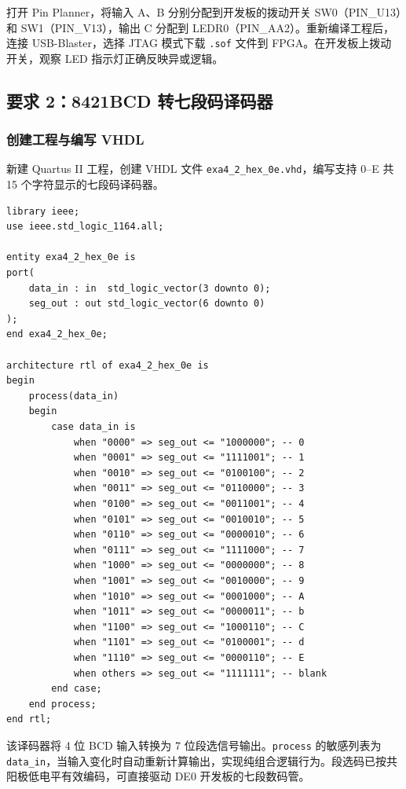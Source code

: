 \documentclass[12pt]{ctexart}
\begin{document}
打开 Pin Planner，将输入 A、B 分别分配到开发板的拨动开关 SW0（PIN\_U13）和 SW1（PIN\_V13），输出 C 分配到 LEDR0（PIN\_AA2）。重新编译工程后，连接 USB-Blaster，选择 JTAG 模式下载 \texttt{.sof} 文件到 FPGA。在开发板上拨动开关，观察 LED 指示灯正确反映异或逻辑。

\subsection{要求 2：8421BCD 转七段码译码器}

\subsubsection{创建工程与编写 VHDL}

新建 Quartus II 工程，创建 VHDL 文件 \texttt{exa4\_2\_hex\_0e.vhd}，编写支持 0--E 共 15 个字符显示的七段码译码器。

\begin{verbatim}
library ieee;
use ieee.std_logic_1164.all;

entity exa4_2_hex_0e is
port(
    data_in : in  std_logic_vector(3 downto 0);
    seg_out : out std_logic_vector(6 downto 0)
);
end exa4_2_hex_0e;

architecture rtl of exa4_2_hex_0e is
begin
    process(data_in)
    begin
        case data_in is
            when "0000" => seg_out <= "1000000"; -- 0
            when "0001" => seg_out <= "1111001"; -- 1
            when "0010" => seg_out <= "0100100"; -- 2
            when "0011" => seg_out <= "0110000"; -- 3
            when "0100" => seg_out <= "0011001"; -- 4
            when "0101" => seg_out <= "0010010"; -- 5
            when "0110" => seg_out <= "0000010"; -- 6
            when "0111" => seg_out <= "1111000"; -- 7
            when "1000" => seg_out <= "0000000"; -- 8
            when "1001" => seg_out <= "0010000"; -- 9
            when "1010" => seg_out <= "0001000"; -- A
            when "1011" => seg_out <= "0000011"; -- b
            when "1100" => seg_out <= "1000110"; -- C
            when "1101" => seg_out <= "0100001"; -- d
            when "1110" => seg_out <= "0000110"; -- E
            when others => seg_out <= "1111111"; -- blank
        end case;
    end process;
end rtl;
\end{verbatim}
\label{lst:hex}

该译码器将 4 位 BCD 输入转换为 7 位段选信号输出。\texttt{process} 的敏感列表为 \texttt{data\_in}，当输入变化时自动重新计算输出，实现纯组合逻辑行为。段选码已按共阳极低电平有效编码，可直接驱动 DE0 开发板的七段数码管。
\end{document}
